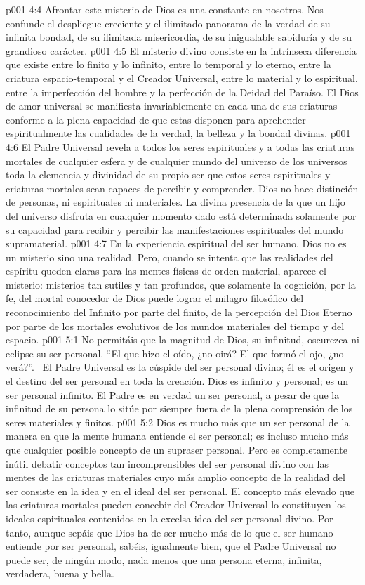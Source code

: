 \vs p001 4:4 \pc Afrontar este misterio de Dios es una constante en nosotros. Nos confunde el despliegue creciente y el ilimitado panorama de la verdad de su infinita bondad, de su ilimitada misericordia, de su inigualable sabiduría y de su grandioso carácter.
\vs p001 4:5 \pc El misterio divino consiste en la intrínseca diferencia que existe entre lo finito y lo infinito, entre lo temporal y lo eterno, entre la criatura espacio\hyp{}temporal y el Creador Universal, entre lo material y lo espiritual, entre la imperfección del hombre y la perfección de la Deidad del Paraíso. El Dios de amor universal se manifiesta invariablemente en cada una de sus criaturas conforme a la plena capacidad de que estas disponen para aprehender espiritualmente las cualidades de la verdad, la belleza y la bondad divinas.
\vs p001 4:6 El Padre Universal revela a todos los seres espirituales y a todas las criaturas mortales de cualquier esfera y de cualquier mundo del universo de los universos toda la clemencia y divinidad de su propio ser que estos seres espirituales y criaturas mortales sean capaces de percibir y comprender. Dios no hace distinción de personas, ni espirituales ni materiales. La divina presencia de la que un hijo del universo disfruta en cualquier momento dado está determinada solamente por su capacidad para recibir y percibir las manifestaciones espirituales del mundo supramaterial.
\vs p001 4:7 En la experiencia espiritual del ser humano, Dios no es un misterio sino una realidad. Pero, cuando se intenta que las realidades del espíritu queden claras para las mentes físicas de orden material, aparece el misterio: misterios tan sutiles y tan profundos, que solamente la cognición, por la fe, del mortal conocedor de Dios puede lograr el milagro filosófico del reconocimiento del Infinito por parte del finito, de la percepción del Dios Eterno por parte de los mortales evolutivos de los mundos materiales del tiempo y del espacio.
\vs p001 5:1 No permitáis que la magnitud de Dios, su infinitud, oscurezca ni eclipse su ser personal. “El que hizo el oído, ¿no oirá? El que formó el ojo, ¿no verá?”.  El Padre Universal es la cúspide del ser personal divino; él es el origen y el destino del ser personal en toda la creación. Dios es infinito y personal; es un ser personal infinito. El Padre es en verdad un ser personal, a pesar de que la infinitud de su persona lo sitúe por siempre fuera de la plena comprensión de los seres materiales y finitos.
\vs p001 5:2 Dios es mucho más que un ser personal de la manera en que la mente humana entiende el ser personal; es incluso mucho más que cualquier posible concepto de un supraser personal. Pero es completamente inútil debatir conceptos tan incomprensibles del ser personal divino con las mentes de las criaturas materiales cuyo más amplio concepto de la realidad del ser consiste en la idea y en el ideal del ser personal. El concepto más elevado que las criaturas mortales pueden concebir del Creador Universal lo constituyen los ideales espirituales contenidos en la excelsa idea del ser personal divino. Por tanto, aunque sepáis que Dios ha de ser mucho más de lo que el ser humano entiende por ser personal, sabéis, igualmente bien, que el Padre Universal no puede ser, de ningún modo, nada menos que una persona eterna, infinita, verdadera, buena y bella.
